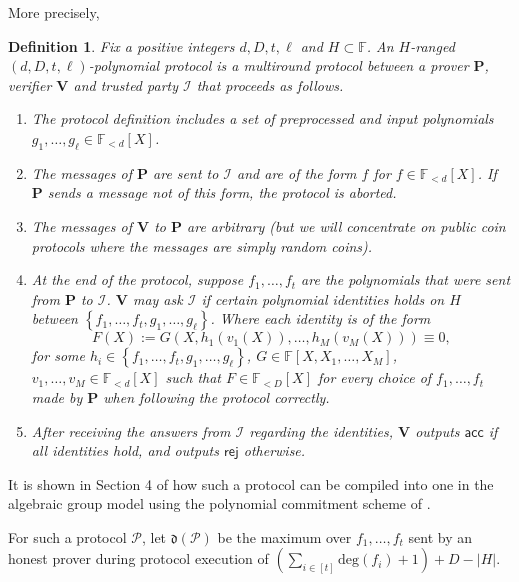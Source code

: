 \documentclass[11pt]{article} %
\newcommand{\F}{\ensuremath{\mathbb F}\xspace}
\renewcommand{\deg}{\ensuremath{\mathrm{deg}}\xspace}
\newcommand{\rej}{\ensuremath{\mathsf{rej}}\xspace}
\newcommand{\acc}{\ensuremath{\mathsf{acc}}\xspace}
\newcommand{\defeq}{:=}
\newcommand{\prv}{\ensuremath{\mathsf{\mathbf{P}}}\xspace}
\newcommand{\prvpoly}{\ensuremath{\prv}\xspace}
\newcommand{\verpoly}{\ensuremath{\ver}\xspace}%
\newcommand{\ideal}{\ensuremath{\mathcal{I}}\xspace}
\newcommand{\ver}{\ensuremath{\mathsf{\mathbf{V}}}\xspace}
\newcommand{\set}[1]{\ensuremath{\left\{#1\right\}}\xspace}
\newcommand{\polysofdeg}[1]{\ensuremath{\F_{< #1}[X]}\xspace}
\newcommand{\prot}{\ensuremath{\mathscr{P}}\xspace}
\newcommand{\aggdeg}[1]{\ensuremath{\mathfrak{d}(#1)}\xspace}
\newtheorem{dfn}[lemma]{Definition}
\begin{document}
More precisely,
\begin{dfn}\label{dfn:polyprotocol}
Fix a positive integers $d,D,t,\ell$ and $H\subset \F$.
An $H$-ranged \emph{$(d,D,t,\ell)$-polynomial protocol} is a multiround protocol between a prover \prvpoly, verifier 
\verpoly and trusted party \ideal that proceeds as follows.

\begin{enumerate}
\item The protocol definition includes a set of \emph{preprocessed and input polynomials} $g_1,\ldots,g_\ell \in \polysofdeg{d}$.

\item The messages of \prvpoly are sent to \ideal and are of the form $f$ for $f\in \polysofdeg{d}$. If \prvpoly sends a message not of this form, the protocol is aborted.
 
 
\item The messages of  \verpoly to \prvpoly are arbitrary (but we will concentrate on public coin protocols where the messages are simply random coins).


 \item At the end of the protocol, suppose $f_1,\ldots,f_t$ are the polynomials that were sent from \prvpoly to \ideal. \verpoly may ask \ideal if certain polynomial identities holds \emph{on $H$} between \set{f_1,\ldots,f_t,g_1,\ldots,g_\ell}.
 Where each identity is of the form
 \[F(X)\defeq G(X, h_1(v_1(X)),\ldots,h_M(v_M(X)))\equiv 0,\]
 for some $h_i\in  \set{f_1,\ldots,f_t,g_1,\ldots,g_\ell}$, $G\in \F[X,X_1,\ldots,X_{M}]$, $v_1,\ldots,v_{M} \in \polysofdeg{d}$
 such that $F\in \polysofdeg{D}$ for every choice of $f_1,\ldots,f_t$ made by \prvpoly when following the protocol correctly.
 
 
 
 \item After receiving the answers from \ideal regarding the identities, \verpoly outputs \acc if all identities hold, and outputs \rej otherwise.

\end{enumerate}
 \end{dfn}
It is shown in Section 4 of \cite{plonk} how such a protocol can be compiled into one in the algebraic group model using the polynomial commitment scheme of \cite{kate}.


For such a protocol \prot, let $\aggdeg{\prot}$ be the maximum over $f_1,\ldots,f_t$ sent by an honest prover during protocol execution of $\left(\sum_{i\in [t]} \deg(f_i)+1\right)+D-|H|$.
\end{document}
